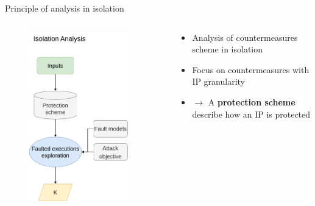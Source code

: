 \begin{frame}[fragile]{Principle of analysis in isolation}
    \begin{columns}
        \begin{column}{0.2\textwidth}
            \begin{figure}
                \includegraphics[scale=0.25]{img/out-of-context-metho.png}
            \end{figure}
    	\vfill
        \end{column}
        \begin{column}{0.04\textwidth} \end{column}
        \begin{small}
            \begin{column}{0.75\textwidth}
                \begin{itemize}
                    \item Analysis of countermeasures scheme in isolation
                    \item Focus on countermeasures with IP granularity
                    \item[] $\rightarrow$ A \textbf{protection scheme} describe how an IP is protected

\end{itemize}
\end{column}
\end{small}
\end{columns}
\end{frame}
